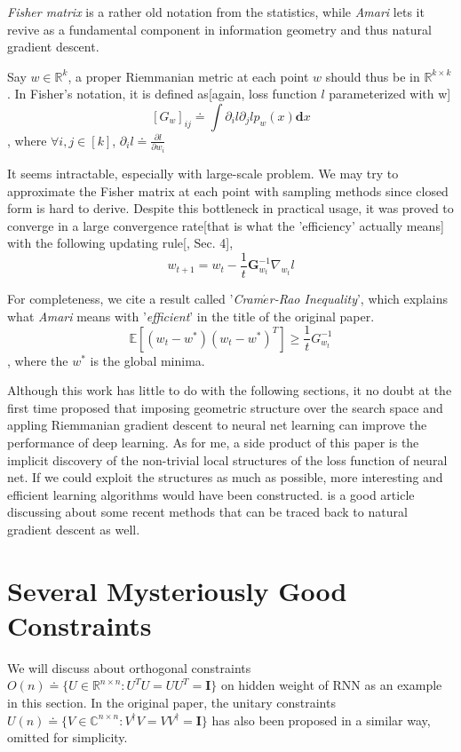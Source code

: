 \documentclass[10pt,a4paper]{article}
\begin{document}
\textit{Fisher matrix} is a rather old notation from the statistics, while \textit{Amari} lets it revive as a fundamental component in information geometry and thus natural gradient descent.

Say $w\in\mathbb{R}^k$, a proper Riemmanian metric at each point $w$ should thus be in $\mathbb{R}^{k\times{k}}$. In Fisher's notation, it is defined as[again, loss function $\mathit{l}$ parameterized with w] 
$$
	[G_{w}]_{ij} \doteq{\int}\partial_i\mathit{l}\partial_j\mathit{l}p_w(x)\mathbf{d}{x}
$$  
, where $\forall{i,j}\in[k]$, $\partial_{i}l\doteq\frac{\partial{l}}{\partial{w_i}}$

It seems intractable, especially with large-scale problem. We may try to approximate the Fisher matrix at each point with sampling methods since closed form is hard to derive. Despite this bottleneck in practical usage, it was proved to converge in a large convergence rate[that is what the 'efficiency' actually means] with the following updating rule[\cite{Amari1998}, Sec. 4],
$$
	w_{t+1} = w_{t}-\frac{1}{t}\mathbf{G}_{w_t}^{-1}\nabla_{w_t}\mathit{l}
$$

For completeness, we cite a result called '\textit{Cram$\acute{e}$r-Rao Inequality}', which explains what \textit{Amari} means with '\textit{efficient}' in the title of the original paper. 
$$
	\mathbb{E}[(w_t-w^{*})(w_t-w^{*})^{T}]\geq\frac{1}{t}G_{w_t}^{-1}
$$
, where the $w^{*}$ is the global minima.

Although this work has little to do with the following sections, it no doubt at the first time proposed that imposing geometric structure over the search space and appling Riemmanian gradient descent to neural net learning can improve the performance of deep learning. As for me, a side product of this paper is the implicit discovery of the non-trivial local structures of the loss function of neural net. If we could exploit the structures as much as possible, more interesting and efficient learning algorithms would have been constructed. \cite{Pascanu2013} is a good article discussing about some recent methods that can be traced back to natural gradient descent as well.

\section{Several Mysteriously Good Constraints\cite{Arjovsky2016}}
We will discuss about orthogonal constraints $O(n)\doteq\{U\in\mathbb{R}^{n\times{n}}:U^{T}{U}=UU^{T}=\mathbf{I}\}$  on hidden weight of RNN as an example in this section. In the original paper, the unitary constraints $U(n)\doteq\{V\in\mathbb{C}^{n\times{n}}:V^{\dagger}{V}=VV^{\dagger}=\mathbf{I}\}$  has also been proposed in a similar way, omitted for simplicity.
\end{document}
